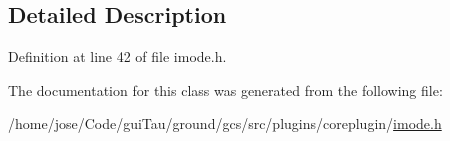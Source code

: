 \subsection{Detailed Description}


Definition at line 42 of file imode.\-h.



The documentation for this class was generated from the following file\-:\begin{DoxyCompactItemize}
\item 
/home/jose/\-Code/gui\-Tau/ground/gcs/src/plugins/coreplugin/\hyperlink{imode_8h}{imode.\-h}\end{DoxyCompactItemize}
